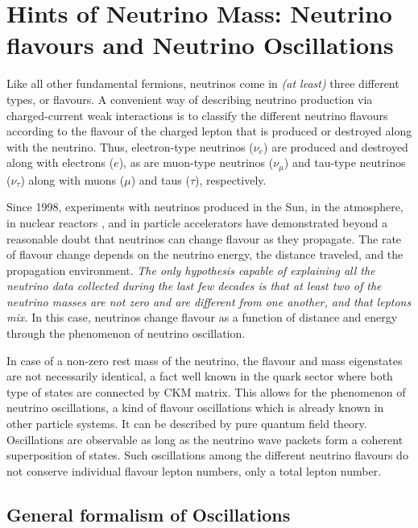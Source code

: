 \section{\label{sec:neutrino_oscillations}Hints of Neutrino Mass: Neutrino flavours and Neutrino Oscillations}

Like all other fundamental fermions, neutrinos come in \emph{(at least)} three different types, or flavours. A convenient way of describing neutrino production via charged-current weak interactions is to classify the different neutrino flavours according to the flavour of the charged lepton that is produced or destroyed along with the neutrino. Thus, electron-type neutrinos (\(\nu _e\)) are produced and destroyed along with electrons (\(e\)), as are muon-type neutrinos (\(\nu _\mu\)) and tau-type neutrinos (\(\nu _\tau\))  along with muons (\(\mu\)) and taus (\(\tau\)), respectively. 

Since 1998, experiments with neutrinos produced in the Sun, in the atmosphere, in nuclear reactors , and in particle accelerators have demonstrated beyond a reasonable doubt that neutrinos can change flavour as they propagate. The rate of flavour change depends on the neutrino energy, the distance traveled, and the propagation environment. \emph{The only hypothesis capable of explaining all the neutrino data collected during the last few decades is that at least two of the neutrino masses are not zero and are different from one another, and that leptons mix.} In this case, neutrinos change flavour as a function of distance and energy through the phenomenon of neutrino oscillation.\cite{Gouvêa_2016} 

In case of a non-zero rest mass of the neutrino, the flavour  and mass eigenstates are not necessarily identical, a fact well known in the quark sector where both type of states are connected by CKM matrix. This allows for the phenomenon of neutrino oscillations, a kind of flavour oscillations which is already known in other particle systems.  It can be described by
pure quantum field theory. Oscillations are observable as long as the neutrino wave
packets form a coherent superposition of states. Such oscillations among the different
neutrino flavours do not conserve individual flavour lepton numbers, only a total
lepton number.

\subsection{General formalism of Oscillations}

